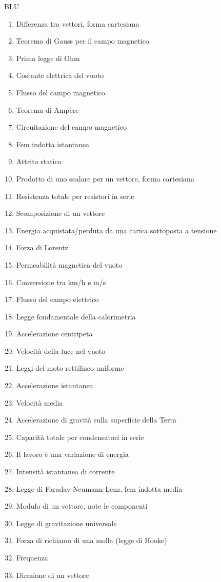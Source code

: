 \documentclass[a4paper,11pt,italian]{article}
\begin{document}
BLU
\begin{enumerate}
\item Differenza tra vettori, forma cartesiana
\item Teorema di Gauss per il campo magnetico
\item Prima legge di Ohm
\item Costante elettrica del vuoto 
\item Flusso del campo magnetico
\item Teorema di Ampère 
\item Circuitazione del campo magnetico
\item Fem indotta istantanea
\item Attrito statico
\item Prodotto di uno scalare per un vettore, forma cartesiana
\item Resistenza totale per resistori in serie
\item Scomposizione di un vettore
\item Energia acquistata/perduta da una carica sottoposta a tensione
\item Forza di Lorentz
\item Permeabilità magnetica del vuoto
\item Conversione tra km/h e m/s
\item Flusso del campo elettrico
\item Legge fondamentale della calorimetria
\item Accelerazione centripeta
\item Velocità della luce nel vuoto
\item Leggi del moto rettilineo uniforme
\item Accelerazione istantanea
\item Velocità media
\item Accelerazione di gravità sulla superficie della Terra 
\item Capacità totale per condensatori in serie
\item Il lavoro è una variazione di energia
\item Intensità istantanea di corrente
\item Legge di Faraday-Neumann-Lenz, fem indotta media
\item Modulo di un vettore, note le componenti
\item Legge di gravitazione universale
\item Forza di richiamo di una molla (legge di Hooke)
\item Frequenza
\item Direzione di un vettore 

\end{enumerate}
\end{document}
